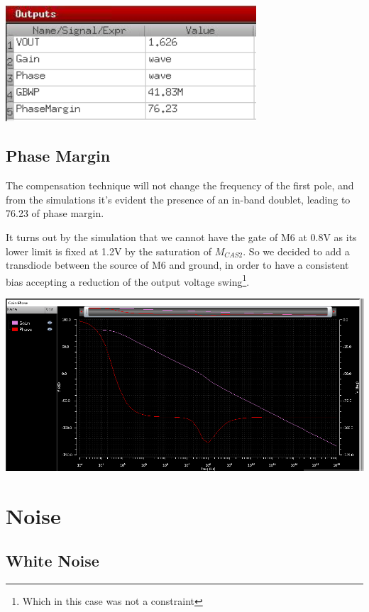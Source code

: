 \centering
\includegraphics[width=0.7\textwidth]{Capitoli/gnp.png}

\raggedright




\subsection{Phase Margin} %
\label{sub:phase_margin}

The compensation technique will not change the frequency of the first pole, and from the simulations it's evident the presence of an in-band doublet, leading to 76.23 of phase margin.


It turns out by the simulation that we cannot have the gate of M6 at 0.8V as its lower limit is fixed at 1.2V by the saturation of $M_{CAS2}$.
So we decided to add a transdiode between the source of M6 and ground, in order to have a consistent bias accepting a reduction of the output voltage swing\footnote{Which in this case was not a constraint}.

\centering
\includegraphics[width=1\textwidth]{Capitoli/gain2.png}
\raggedright

\vfill
\section{Noise} %
\label{sec:noise}


\subsection{White Noise} %
\label{sub:white_noise}

